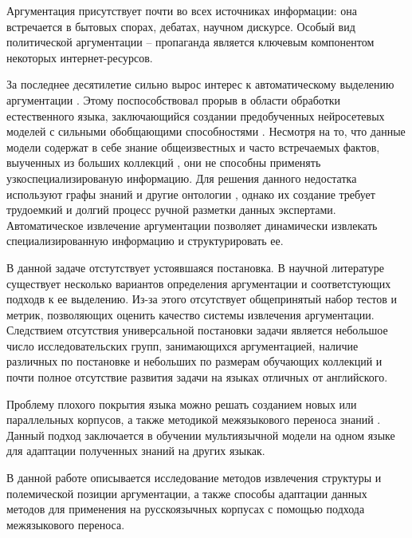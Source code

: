 Аргументация присутствует почти во всех источниках информации: она встречается в бытовых спорах, дебатах, научном дискурсе. Особый вид политической аргументации – пропаганда является ключевым компонентом некоторых интернет-ресурсов.

За последнее десятилетие сильно вырос интерес к автоматическому выделению аргументации \cite{lippi2016argumentation}. Этому поспособствовал прорыв в области обработки естественного языка, заключающийся создании предобученных нейросетевых моделей с сильными обобщающими способностями \cite{mikolov2013efficient, devlin2018bert, radford2019language}. Несмотря на то, что данные модели содержат в себе знание общеизвестных и часто встречаемых фактов, выученных из больших коллекций \cite{petroni2019language}, они не способны применять узкоспециализированую информацию. Для решения данного недостатка используют графы знаний и другие онтологии \cite{sorokin2018modeling, chen2019multi}, однако их создание требует трудоемкий и долгий процесс ручной разметки данных экспертами. Автоматическое извлечение аргументации позволяет динамически извлекать специализированную информацию и структурировать ее.

В данной задаче отстутствует устоявшаяся постановка. В научной литературе существует несколько вариантов определения аргументации и соответстующих подходв к ее выделению. Из-за этого отсутствует общепринятый набор тестов и метрик, позволяющих оценить качество системы извлечения аргументации. Следствием отсутствия универсальной постановки задачи является небольшое число исследовательских групп, занимающихся аргументацией, наличие различных по постановке и небольших по размерам обучающих коллекций и почти полное отсутствие развития задачи на языках отличных от английского.

Проблему плохого покрытия языка можно решать созданием новых или параллельных \cite{fishcheva2019cross}  корпусов, а также методикой межязыкового переноса знаний \cite{ponti2020xcopa, eriguchi2018zero}. Данный подход заключается в обучении мультиязычной модели на одном языке для адаптации полученных знаний на других языкак.

В данной работе описывается исследование методов извлечения структуры и полемической позиции аргументации, а также способы адаптации данных методов для применения на русскоязычных корпусах с помощью подхода межязыкового переноса.

